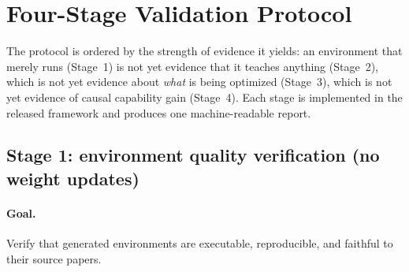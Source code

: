 \section{Four-Stage Validation Protocol}
\label{sec:protocol}

The protocol is ordered by the strength of evidence it yields: an environment
that merely runs (Stage~1) is not yet evidence that it teaches anything
(Stage~2), which is not yet evidence about \emph{what} is being optimized
(Stage~3), which is not yet evidence of causal capability gain (Stage~4). Each
stage is implemented in the released framework and produces one machine-readable
report.

\subsection{Stage 1: environment quality verification (no weight updates)}
\label{sec:stage1}

\paragraph{Goal.} Verify that generated environments are executable,
reproducible, and faithful to their source papers.

